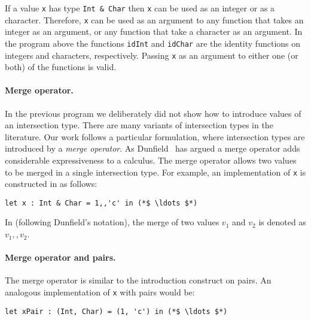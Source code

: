 \noindent If a value \lstinline{x} has type \lstinline{Int & Char} then
\lstinline{x} can be used as an integer or as a character. Therefore,
\lstinline{x} can be used as an argument to any function that takes
an integer as an argument, or any
function that take a character as an argument. In the program above
the functions \lstinline{idInt} and \lstinline{idChar} are the
identity functions on integers and characters, respectively.
Passing \lstinline{x} as an argument to either one (or both) of the
functions is valid.

\paragraph{Merge operator.}
In the previous program we deliberately did not show how to introduce values of an
intersection type. There are many variants of intersection types
in the literature. Our work follows a particular formulation, where
intersection types are introduced by a \emph{merge operator}.
As Dunfield~\cite{dunfield2014elaborating} has argued a merge operator adds considerable
expressiveness to a calculus. The merge operator allows
two values to be merged in a single intersection type. 
For example, an implementation of \lstinline{x} is constructed in \name as follows:

\begin{lstlisting}
let x : Int & Char = 1,,'c' in (*$ \ldots $*)
\end{lstlisting}

\noindent In \name (following Dunfield's notation), the
merge of two values $v_1$ and $v_2$ is denoted as $v_1 ,, v_2$.

\paragraph{Merge operator and pairs.}
The merge operator is similar to the introduction construct on pairs.
An analogous implementation of \lstinline{x} with pairs would be:

\begin{lstlisting}
let xPair : (Int, Char) = (1, 'c') in (*$ \ldots $*)
\end{lstlisting}

